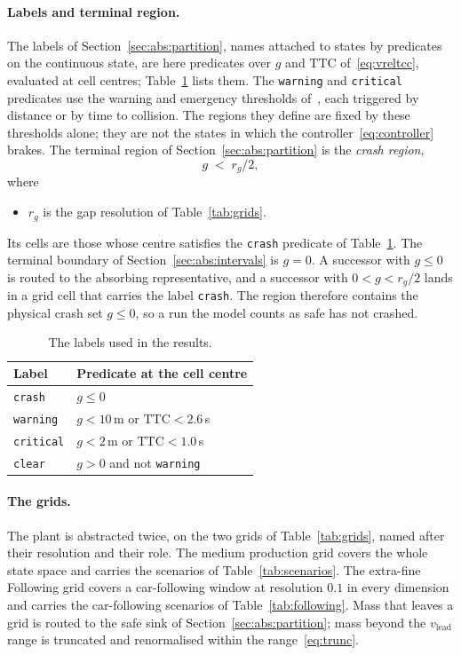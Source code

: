 \documentclass[11pt,a4paper]{article}
\newcommand{\vlead}{v_{\text{lead}}}
\theoremstyle{plain}
\theoremstyle{remark}
\begin{document}
	\paragraph{Labels and terminal region.}
	The labels of Section~\ref{sec:abs:partition}, names attached to states by predicates on the continuous state, are here predicates over $g$ and $\mathrm{TTC}$ of~\eqref{eq:vreltcc}, evaluated at cell centres; Table~\ref{tab:labels} lists them. The \texttt{warning} and \texttt{critical} predicates use the warning and emergency thresholds of~\cite{EuroNCAP}, each triggered by distance or by time to collision. The regions they define are fixed by these thresholds alone; they are not the states in which the controller~\eqref{eq:controller} brakes. The terminal region of Section~\ref{sec:abs:partition} is the \emph{crash region},
	\begin{equation}
		g \;<\; r_g/2,
		\label{eq:crashq}
	\end{equation}
	where
	\begin{itemize}
		\item $r_g$ is the gap resolution of Table~\ref{tab:grids}.
	\end{itemize}
	Its cells are those whose centre satisfies the \texttt{crash} predicate of Table~\ref{tab:labels}. The terminal boundary of Section~\ref{sec:abs:intervals} is $g = 0$. A successor with $g \le 0$ is routed to the absorbing representative, and a successor with $0 < g < r_g/2$ lands in a grid cell that carries the label \texttt{crash}. The region therefore contains the physical crash set $g \le 0$, so a run the model counts as safe has not crashed.
	
	\begin{table}[H]
		\centering
		\begin{tabular}{ll}
			\toprule
			Label & Predicate at the cell centre \\
			\midrule
			\texttt{crash} & $g \le 0$ \\
			\texttt{warning} & $g < 10$\,m or $\mathrm{TTC} < 2.6$\,s \\
			\texttt{critical} & $g < 2$\,m or $\mathrm{TTC} < 1.0$\,s \\
			\texttt{clear} & $g > 0$ and not \texttt{warning} \\
			\bottomrule
		\end{tabular}
		\caption{The labels used in the results.}
		\label{tab:labels}
	\end{table}
	
	\paragraph{The grids.}
	The plant is abstracted twice, on the two grids of Table~\ref{tab:grids}, named after their resolution and their role. The medium production grid covers the whole state space and carries the scenarios of Table~\ref{tab:scenarios}. The extra-fine Following grid covers a car-following window at resolution $0.1$ in every dimension and carries the car-following scenarios of Table~\ref{tab:following}. Mass that leaves a grid is routed to the safe sink of Section~\ref{sec:abs:partition}; mass beyond the $\vlead$ range is truncated and renormalised within the range~\eqref{eq:trunc}.
	
\end{document}
